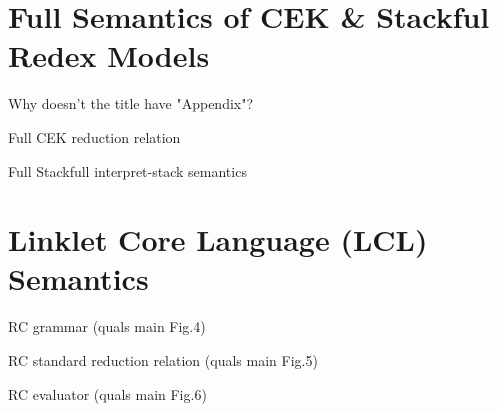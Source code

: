 \begin{appendices}



\chapter[\texorpdfstring{Full Semantics of CEK \& Stackful Redex Models}
                          {Appendix A}]{Full Semantics of CEK \& Stackful Redex Models}
\label{appendix:cek-stackful-redex}

    \begin{todo}
        Why doesn't the title have "Appendix"?
    \end{todo}

    \begin{figure-here}
        Full CEK reduction relation
    \end{figure-here}

    \begin{figure-here}
        Full Stackfull interpret-stack semantics
    \end{figure-here}

\chapter[\texorpdfstring{Linklet Kernel Language (LKL) Semantics}{Appendix B}]{Linklet Core Language (LCL) Semantics}
\label{appendix:linklet-kernel-language}

    \begin{figure-here}
        RC grammar (quals main Fig.4)
    \end{figure-here}

    \begin{figure-here}
        RC standard reduction relation (quals main Fig.5)
    \end{figure-here}

    \begin{figure-here}
        RC evaluator (quals main Fig.6)
    \end{figure-here}




\end{appendices}